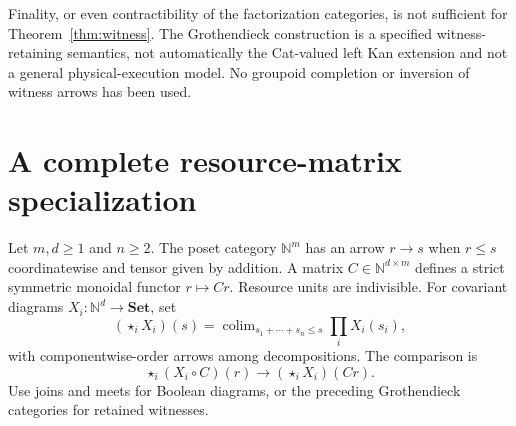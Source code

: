 \documentclass[11pt]{article}
\theoremstyle{definition}\newtheorem{definition}[theorem]{Definition}
\theoremstyle{remark}\newtheorem{remark}[theorem]{Remark}
\newcommand{\Set}{\mathbf{Set}}
\newcommand{\N}{\mathbb N}
\begin{document}
Finality, or even contractibility of the factorization categories, is
not sufficient for Theorem~\ref{thm:witness}. The Grothendieck construction
is a specified witness-retaining semantics, not automatically the
Cat-valued left Kan extension and not a general physical-execution model.
No groupoid completion or inversion of witness arrows has been used.

\section{A complete resource-matrix specialization}
Let $m,d\geq1$ and $n\geq2$. The poset category $\N^m$ has an arrow
$r\to s$ when $r\leq s$ coordinatewise and tensor given by addition.
A matrix $C\in\N^{d\times m}$ defines a strict symmetric monoidal
functor $r\mapsto Cr$. Resource units are indivisible. For covariant
diagrams $X_i:\N^d\to\Set$, set
\[
 (\mathop{\star}_iX_i)(s)
   =\mathop{\operatorname{colim}}_{s_1+\cdots+s_n\leq s}
      \prod_iX_i(s_i),
\]
with componentwise-order arrows among decompositions. The comparison is
\begin{equation}\label{eq:budget}
 \mathop{\star}_i(X_i\circ C)(r)
      \longrightarrow(\mathop{\star}_iX_i)(Cr).
\end{equation}
Use joins and meets for Boolean diagrams, or the preceding Grothendieck
categories for retained witnesses.
\end{document}
